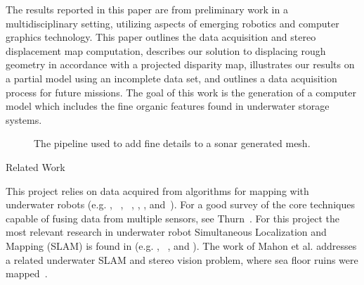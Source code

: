 \documentclass[twocolumn]{article}
\makeatletter
\def\section{\@startsection{section}{1}{\z@}{24pt plus 2 pt
minus 2 pt} {12pt plus 2pt minus 2pt}{\large\bf}}
\makeatother
\begin{document}
The results reported in this paper are from preliminary work in a multidisciplinary setting, utilizing aspects of emerging robotics and computer graphics technology. This paper outlines the data acquisition and stereo displacement map computation, describes our solution to displacing rough geometry in accordance with a projected disparity map, illustrates our results on a partial model using an incomplete data set, and outlines a data acquisition process for future missions. The goal of this work is the generation of a computer model which includes the fine organic features found in underwater storage systems.

\begin{figure*}[!ht]
  \vspace{-0.2cm}
  \caption{The pipeline used to add fine details to a sonar generated mesh.}
 \label{fig:systemblock}
\end{figure*}

\section{Related Work}
\label{sec:data}

This project relies on data acquired from algorithms for mapping with underwater robots (e.g. \cite{Williams2000}, ~\cite{Williams09}, ~\cite{opizarro-2009a}, \cite{Fairfield2005,Fairfield2006}, \cite{Clark2008b}, and~\cite{White10}). For a good survey of the core techniques capable of fusing data from multiple sensors, see Thurn~\cite{Thrun2005}.
For this project the most relevant  research in underwater robot Simultaneous Localization and Mapping (SLAM) is found in (e.g. \cite{Williams2000}, ~\cite{harbor}, and \cite{Fairfield2005,Fairfield2006}).  
The work of Mahon et al. addresses a related underwater SLAM and stereo vision problem, where sea floor ruins were mapped~\cite{Mahon:2011}.
\end{document}
